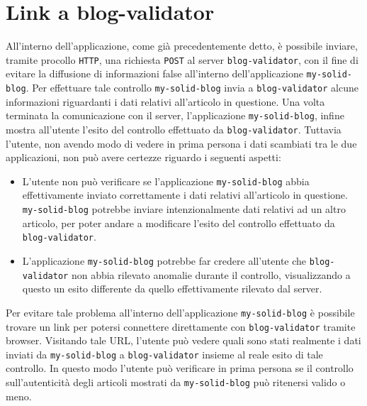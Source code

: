 \bigskip

\section{Link a blog-validator}

\medskip

All'interno dell'applicazione, come già precedentemente detto, è possibile inviare, tramite procollo {\tt HTTP}, una richiesta {\tt POST} al server {\tt blog-validator}, con il fine di evitare la diffusione di informazioni false all'interno dell'applicazione {\tt my-solid-blog}. Per effettuare tale controllo {\tt my-solid-blog} invia a {\tt blog-validator} alcune informazioni riguardanti i dati relativi all'articolo in questione. Una volta terminata la comunicazione con il server, l'applicazione {\tt my-solid-blog}, infine mostra all'utente l'esito del controllo effettuato da {\tt blog-validator}. Tuttavia l'utente, non avendo modo di vedere in prima persona i dati scambiati tra le due applicazioni, non può avere certezze riguardo i seguenti aspetti:

\begin{itemize}
	\item L'utente non può verificare se l'applicazione {\tt my-solid-blog} abbia effettivamente inviato correttamente i dati relativi all'articolo in questione. {\tt my-solid-blog} potrebbe inviare intenzionalmente dati relativi ad un altro articolo, per poter andare a modificare l'esito del controllo effettuato da {\tt blog-validator}.
	\item L'applicazione {\tt my-solid-blog} potrebbe far credere all'utente che {\tt blog-validator} non abbia rilevato anomalie durante il controllo, visualizzando a questo un esito differente da quello effettivamente rilevato dal server.
\end{itemize}

\medskip

Per evitare tale problema all'interno dell'applicazione {\tt my-solid-blog} è possibile trovare un link per potersi connettere direttamente con {\tt blog-validator} tramite browser. Visitando tale URL, l'utente può vedere quali sono stati realmente i dati inviati da {\tt my-solid-blog} a {\tt blog-validator} insieme al reale esito di tale controllo. In questo modo l'utente può verificare in prima persona se il controllo sull'autenticità degli articoli mostrati da {\tt my-solid-blog} può ritenersi valido o meno.

\clearpage

